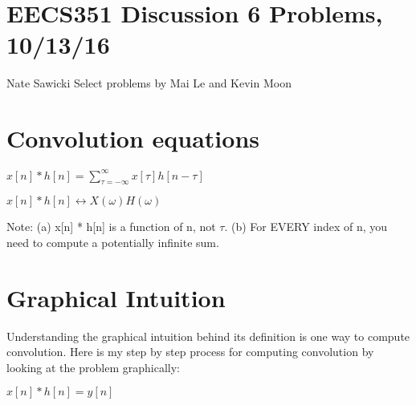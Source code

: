 \documentclass[11pt]{article}
\begin{document}
\section*{EECS351 Discussion 6 Problems, 10/13/16}
Nate Sawicki \newline
Select problems by Mai Le and Kevin Moon


\section{Convolution equations}

\vspace{3mm}

\begin{center}

$
x[n] * h[n] = \sum_{\tau  = -\infty}^{\infty} x[\tau] h[n - \tau]
$
\end{center}

\vspace{3mm}


\begin{center}

$
x[n] *  h[n] \longleftrightarrow X(\omega)H(\omega)
$
\end{center}

Note:\newline
(a) x[n] *  h[n] is a function of n, not $\tau$.\newline
(b) For EVERY index of n, you need to compute a potentially infinite sum.

\vspace{3mm}

\section{Graphical Intuition}

Understanding the graphical intuition behind its definition is one way to compute convolution. Here is my step by step process for computing convolution by looking at the problem graphically:\newline

\begin{center}

$
x[n] * h[n] = y[n]
$
\end{center}

\vspace{1.5mm}
\end{document}
